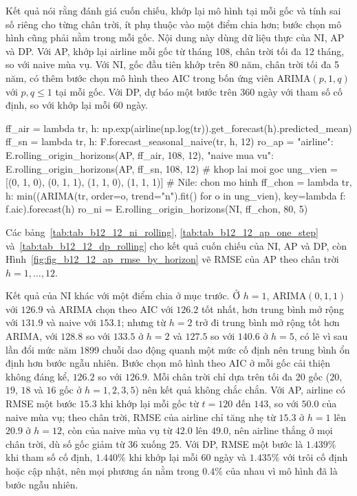  Kết quả  nói rằng đánh giá cuốn chiếu, khớp lại mô hình tại mỗi gốc và tính sai số riêng cho từng chân trời, ít phụ thuộc vào một điểm chia hơn; bước chọn mô hình cũng phải nằm trong mỗi gốc.
 Nội dung này dùng dữ liệu thực của NI, AP và DP. Với AP, khớp lại airline mỗi gốc từ tháng 108, chân trời tối đa 12 tháng, so với naive mùa vụ. Với NI, gốc đầu tiên khớp trên 80 năm, chân trời tối đa 5 năm, có thêm bước chọn mô hình theo AIC trong bốn ứng viên ARIMA$(p,1,q)$ với $p,q\le1$ tại mỗi gốc. Với DP, dự báo một bước trên $360$ ngày với tham số cố định, so với khớp lại mỗi $60$ ngày.
\begin{codeblock}
ff_air = lambda tr, h: np.exp(airline(np.log(tr)).get_forecast(h).predicted_mean)
ff_sn = lambda tr, h: F.forecast_seasonal_naive(tr, h, 12)
ro_ap = {"airline": E.rolling_origin_horizons(AP, ff_air, 108, 12),
         "naive mua vu": E.rolling_origin_horizons(AP, ff_sn, 108, 12)}      # khop lai moi goc
ung_vien = [(0, 1, 0), (0, 1, 1), (1, 1, 0), (1, 1, 1)]                      # Nile: chon mo hinh
ff_chon = lambda tr, h: min((ARIMA(tr, order=o, trend="n").fit() for o in ung_vien),
                            key=lambda f: f.aic).forecast(h)
ro_ni = E.rolling_origin_horizons(NI, ff_chon, 80, 5)
\end{codeblock}
 Các bảng~\ref{tab:tab_b12_12_ni_rolling}, \ref{tab:tab_b12_12_ap_one_step} và~\ref{tab:tab_b12_12_dp_rolling} cho kết quả cuốn chiếu của NI, AP và DP, còn Hình~\ref{fig:fig_b12_12_ap_rmse_by_horizon} vẽ RMSE của AP theo chân trời $h=1,\dots,12$.



 Kết quả của NI khác với một điểm chia ở mục trước. Ở $h=1$, ARIMA$(0,1,1)$ với $126.9$ và ARIMA chọn theo AIC với $126.2$ tốt nhất, hơn trung bình mở rộng với $131.9$ và naive với $153.1$; nhưng từ $h=2$ trở đi trung bình mở rộng tốt hơn ARIMA, với $128.8$ so với $133.5$ ở $h=2$ và $127.5$ so với $140.6$ ở $h=5$, có lẽ vì sau lần đổi mức năm 1899 chuỗi dao động quanh một mức cố định nên trung bình ổn định hơn bước ngẫu nhiên. Bước chọn mô hình theo AIC ở mỗi gốc cải thiện không đáng kể, $126.2$ so với $126.9$. Mỗi chân trời chỉ dựa trên tối đa $20$ gốc ($20$, $19$, $18$ và $16$ gốc ở $h=1,2,3,5$) nên kết quả không chắc chắn. Với AP, airline có RMSE một bước $15.3$ khi khớp lại mỗi gốc từ $t=120$ đến $143$, so với $50.0$ của naive mùa vụ; theo chân trời, RMSE của airline chỉ tăng nhẹ từ $15.3$ ở $h=1$ lên $20.9$ ở $h=12$, còn của naive mùa vụ từ $42.0$ lên $49.0$, nên airline thắng ở mọi chân trời, dù số gốc giảm từ $36$ xuống $25$. Với DP, RMSE một bước là $1.439\%$ khi tham số cố định, $1.440\%$ khi khớp lại mỗi $60$ ngày và $1.435\%$ với trôi cố định hoặc cập nhật, nên mọi phương án nằm trong $0.4\%$ của nhau vì mô hình đã là bước ngẫu nhiên.

